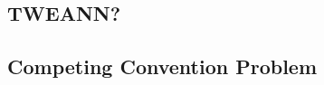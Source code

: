 \subsection{TWEANN?}
\label{subsec:tweann}
\subsection{Competing Convention Problem}
\label{subsec:competing_convention_problem}

